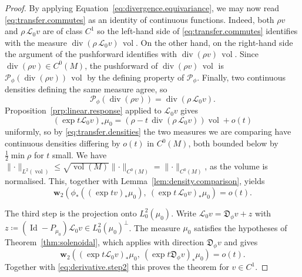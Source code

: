 \documentclass[11pt,reqno]{amsart}
\theoremstyle{plain}
\theoremstyle{definition}
\newcommand{\dw}{\mathbf{w}_2}
\newcommand{\D}{\mathfrak{D}}
\newcommand{\Transf}{\mathcal{L}}
\newcommand{\PF}{\mathcal{P}}
\DeclareMathOperator{\Id}{Id}
\DeclareMathOperator{\vol}{vol}
\DeclareMathOperator{\Div}{div}
\begin{document}
\begin{proof}
    By applying Equation~\eqref{eq:divergence.equivariance}, we may now read \eqref{eq:transfer.commutes}  as an identity of continuous functions.
    Indeed, both \( \rho v \) and \( \rho\,\Transf_0v \) are of class \( C^1 \) so the left-hand side of \eqref{eq:transfer.commutes} identifies with the measure \( \Div(\rho\,\Transf_0v)\,\vol \).
    On the other hand, on the right-hand side the argument of the pushforward identifies with \( \Div(\rho v)\,\vol \).
	Since \(\Div(\rho v)\in C^0(M)\), the pushforward of \(\Div(\rho v)\,\vol\) is \(\PF_\phi(\Div(\rho v))\,\vol\) by the defining property of \(\PF_\phi\).
    Finally, two continuous densities defining the same measure agree, so
    \begin{equation}\label{eq:transfer.densities}
        \PF_\phi \left(\Div(\rho v)\right)=\Div\left(\rho\,\Transf_0v\right) .
    \end{equation}
    Proposition~\ref{prp:linear.response} applied to \( \Transf_0v \) gives
    \[
        (\exp t\Transf_0v)_\ast\mu_0=\left(\rho-t\,\Div(\rho\,\Transf_0v)\right)\vol+o(t)
    \]
    uniformly, so by \eqref{eq:transfer.densities} the two measures we are comparing have continuous densities differing by \( o(t) \) in \( C^0(M) \), both bounded below by \( \tfrac12\min\rho \) for \( t \) small.
    We have \( \lVert\cdot\rVert_{L^2(\vol)}\le\sqrt{\vol(M)}\lVert\cdot\rVert_{C^0(M)} = \lVert\cdot\rVert_{C^0(M)} \), as the volume is normalised.
    This, together with Lemma~\ref{lem:density.comparison}, yields
    \begin{equation}\label{eq:derivative.step2}
        \dw\left(\phi_\ast\left((\exp tv)_\ast\mu_0\right),\ (\exp t\,\Transf_0v)_\ast\mu_0\right)=o(t).
    \end{equation}

    The third step is the projection onto \( L^2_0(\mu_0) \).
    Write \( \Transf_0v=\D_\phi v+z \) with \( z\coloneqq(\Id-P_{\mu_0})\Transf_0v\in L^2_0(\mu_0)^\perp \).
    The measure \( \mu_0 \) satisfies the hypotheses of Theorem~\ref{thm:solenoidal}, which applies with direction \( \D_\phi v \) and gives
    \[
        \dw\left((\exp t\Transf_0v)_\ast\mu_0,\ (\exp t\D_\phi v)_\ast\mu_0\right)=o(t) .
    \]
    Together with \eqref{eq:derivative.step2} this proves the theorem for \( v\in C^1 \).


\end{proof}
\end{document}
